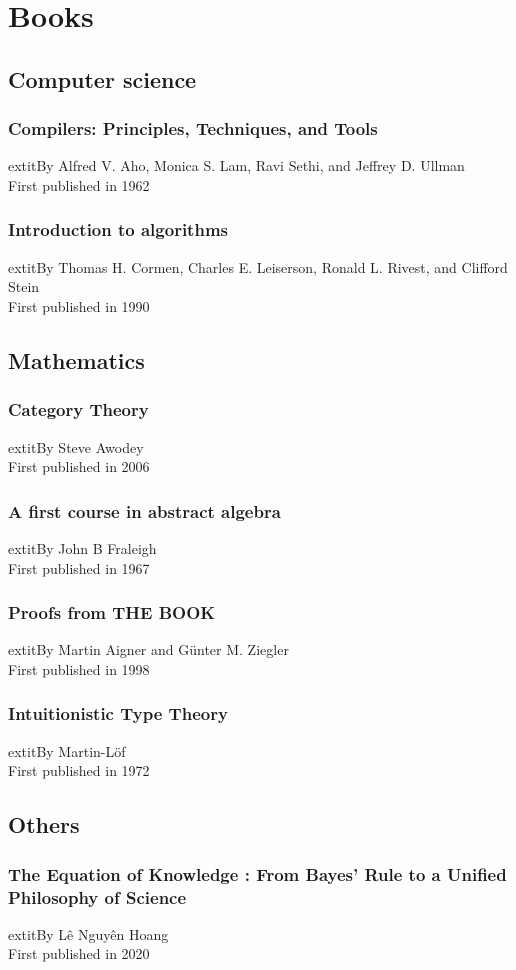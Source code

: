 \documentclass{article}
\begin{document}
    \section{Books}

\subsection*{Computer science}
\subsubsection*{Compilers: Principles, Techniques, and Tools}
	extit{By Alfred V. Aho, Monica S. Lam, Ravi Sethi, and Jeffrey D. Ullman}\\
First published in 1962
\subsubsection*{Introduction to algorithms}
	extit{By Thomas H. Cormen, Charles E. Leiserson, Ronald L. Rivest, and Clifford Stein}\\
First published in 1990
\subsection*{Mathematics}
\subsubsection*{Category Theory}
	extit{By Steve Awodey}\\
First published in 2006
\subsubsection*{A first course in abstract algebra}
	extit{By John B Fraleigh}\\
First published in 1967
\subsubsection*{Proofs from THE BOOK}
	extit{By Martin Aigner and Günter M. Ziegler}\\
First published in 1998
\subsubsection*{Intuitionistic Type Theory}
	extit{By Martin-Löf}\\
First published in 1972
\subsection*{Others}
\subsubsection*{The Equation of Knowledge : From Bayes' Rule to a Unified Philosophy of Science}
	extit{By Lê Nguyên Hoang}\\
First published in 2020
\end{document}
